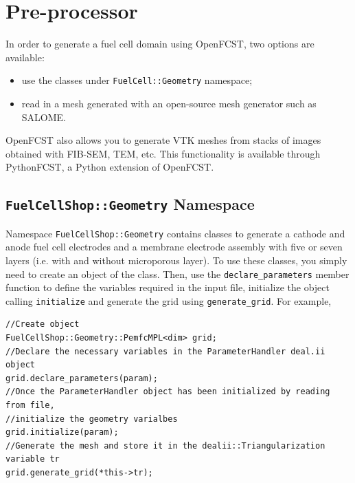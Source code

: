 \chapter{Pre-processor}

In order to generate a fuel cell domain using OpenFCST, two options are available:
\begin{itemize}
 \item use the classes under \texttt{FuelCell::Geometry} namespace;
 \item read in a mesh generated with an open-source mesh generator such as SALOME.
\end{itemize}

OpenFCST also allows you to generate VTK meshes from stacks of images obtained with FIB-SEM, TEM, etc. This functionality is available through PythonFCST, a Python extension of OpenFCST.

\section{\texttt{FuelCellShop::Geometry} Namespace}
Namespace \texttt{FuelCellShop::Geometry} contains classes to generate a cathode and anode fuel cell electrodes and a membrane electrode assembly with five or seven layers (i.e. with and without microporous layer). To use these classes, you simply need to create an object of the class. Then, use the \verb!declare_parameters! member function to define the variables required in the input file, initialize the object calling \verb!initialize! and generate the grid using \verb!generate_grid!. For example,
\begin{lstlisting}
//Create object
FuelCellShop::Geometry::PemfcMPL<dim> grid; 
//Declare the necessary variables in the ParameterHandler deal.ii object
grid.declare_parameters(param);         
//Once the ParameterHandler object has been initialized by reading from file, 
//initialize the geometry varialbes 
grid.initialize(param);                 
//Generate the mesh and store it in the dealii::Triangularization variable tr  
grid.generate_grid(*this->tr);          
\end{lstlisting}

